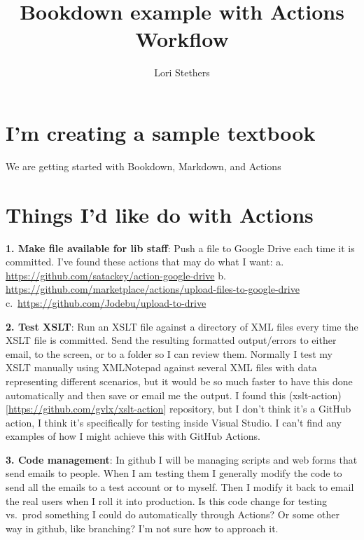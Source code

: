 \documentclass[
  openany]{book}
\title{Bookdown example with Actions Workflow}
\author{Lori Stethers}
\date{}
\begin{document}
\maketitle

{
\setcounter{tocdepth}{1}
\tableofcontents
}
\hypertarget{im-creating-a-sample-textbook}{%
\chapter{I'm creating a sample textbook}\label{im-creating-a-sample-textbook}}

We are getting started with Bookdown, Markdown, and Actions

\hypertarget{things-id-like-do-with-actions}{%
\chapter{Things I'd like do with Actions}\label{things-id-like-do-with-actions}}

\textbf{1. Make file available for lib staff}: Push a file to Google Drive each time it is committed. I've found these actions that may do what I want:
a. \url{https://github.com/satackey/action-google-drive}
b. \url{https://github.com/marketplace/actions/upload-files-to-google-drive}
c.~\url{https://github.com/Jodebu/upload-to-drive}

\textbf{2. Test XSLT}: Run an XSLT file against a directory of XML files every time the XSLT file is committed. Send the resulting formatted output/errors to either email, to the screen, or to a folder so I can review them.
Normally I test my XSLT manually using XMLNotepad against several XML files with data representing different scenarios, but it would be so much faster to have this done automatically and then save or email me the output.
I found this (xslt-action){[}\url{https://github.com/gvlx/xslt-action}{]} repository, but I don't think it's a GitHub action, I think it's specifically for testing inside Visual Studio.
I can't find any examples of how I might achieve this with GitHub Actions.

\textbf{3. Code management}: In github I will be managing scripts and web forms that send emails to people. When I am testing them I generally modify the code to send all the emails to a test account or to myself. Then I modify it back to email the real users when I roll it into production. Is this code change for testing vs.~prod something I could do automatically through Actions? Or some other way in github, like branching? I'm not sure how to approach it.
\end{document}
